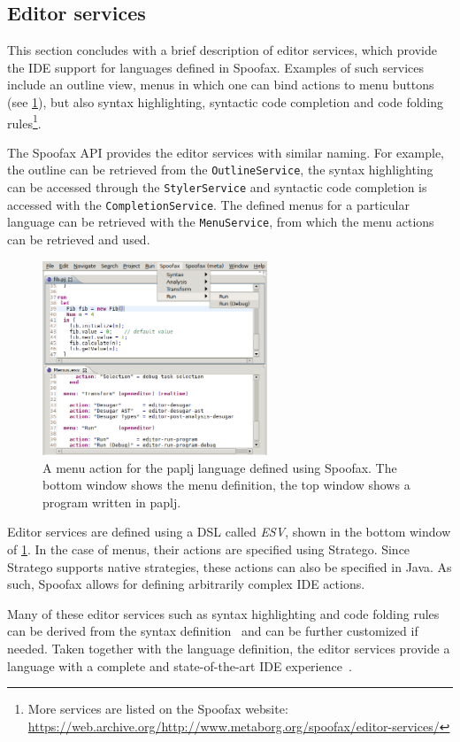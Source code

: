 \subsection{Editor services}
\label{ssec:editor-serv}
This section concludes with a brief description of editor services,
which provide the IDE support for languages defined in
Spoofax. Examples of such services include an outline view, menus in
which one can bind actions to menu buttons (see
\cref{fig:menu-actions}), but also syntax highlighting, syntactic code
completion and code folding rules\footnote{More services are
listed on the Spoofax website:
\url{https://web.archive.org/http://www.metaborg.org/spoofax/editor-services/}}.

The Spoofax API provides the editor services with similar naming. For
example, the outline can be retrieved from the \texttt{OutlineService}, the
syntax highlighting can be accessed through the \texttt{StylerService} and
syntactic code completion is accessed with the
\texttt{CompletionService}. The defined menus for a particular language can
be retrieved with the \texttt{MenuService}, from which the menu actions can
be retrieved and used.

\begin{figure}[bt]
\centering
\includegraphics[width=0.6\textwidth]{./img/menu-actions.png}
\caption{\label{fig:menu-actions}
A menu action for the paplj language defined using Spoofax. The bottom window shows the menu definition, the top window shows a program written in paplj.}
\end{figure}

Editor services are defined using a DSL called \textit{ESV}, shown in the bottom
window of \cref{fig:menu-actions}. In the case of menus, their actions are
specified using Stratego. Since Stratego supports native strategies, these
actions can also be specified in Java. As such, Spoofax allows for defining
arbitrarily complex IDE actions.

Many of these editor services such as syntax highlighting and code
folding rules can be derived from the syntax
definition~\cite{Kats10c} and can be further customized if
needed. Taken together with the language definition, the editor
services provide a language with a complete and state-of-the-art IDE
experience~\cite{Kats10a}.
